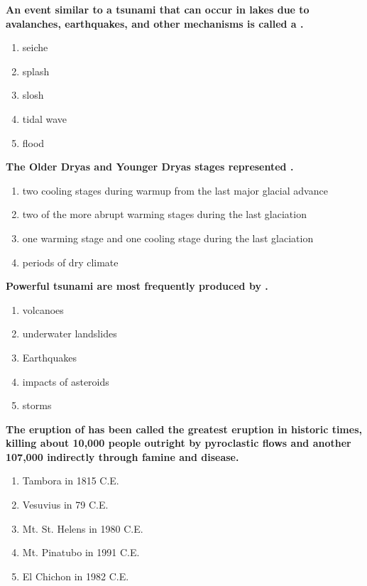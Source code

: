 \item {
\setlength{\itemsep}{0cm}
\setlength{\parskip}{.2cm}
\begin{samepage}
\textbf{
An event similar to a tsunami that can occur in lakes due to avalanches, earthquakes, and other mechanisms is called a \makebox[1cm]{\Rivpt\hrulefill\Rivpt}.
}
\begin{enumerate}
\item { 	seiche }
\item { 	splash }
\item { 	slosh }
\item { 	tidal wave }
\item { 	flood }
\end{enumerate}
\end{samepage}
}
\item {
\setlength{\itemsep}{0cm}
\setlength{\parskip}{.2cm}
\begin{samepage}
\textbf{
The Older Dryas and Younger Dryas stages represented \makebox[1cm]{\Rivpt\hrulefill\Rivpt}.
}
\begin{enumerate}
\item {  two cooling stages during warmup from the last major glacial advance }
\item {  two of the more abrupt warming stages during the last glaciation }
\item {  one warming stage and one cooling stage during the last glaciation }
\item {  periods of dry climate  }
\end{enumerate}
\end{samepage}
}
\item {
\setlength{\itemsep}{0cm}
\setlength{\parskip}{.2cm}
\begin{samepage}
\textbf{
Powerful tsunami are most frequently produced by \makebox[1cm]{\Rivpt\hrulefill\Rivpt}.
}
\begin{enumerate}
\item { 	volcanoes }
\item { 	underwater landslides }
\item { 	Earthquakes }
\item { 	impacts of asteroids }
\item { 	storms 		 }
\end{enumerate}
\end{samepage}
}
\item {
\setlength{\itemsep}{0cm}
\setlength{\parskip}{.2cm}
\begin{samepage}
\textbf{
The eruption of \makebox[1cm]{\Rivpt\hrulefill\Rivpt} has been called the greatest eruption in historic times, killing about 10,000 people outright by pyroclastic flows and another 107,000 indirectly through famine and disease. 
}
\begin{enumerate}
\item {  Tambora in 1815 C.E. }
\item {  Vesuvius in 79 C.E. }
\item {  Mt. St. Helens in 1980 C.E. }
\item {  Mt. Pinatubo in 1991 C.E. }
\item {  El Chichon in 1982 C.E. }
\end{enumerate}
\end{samepage}
}
